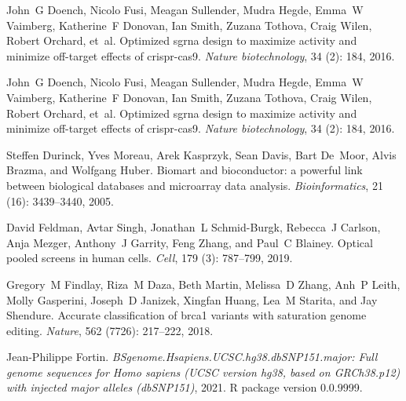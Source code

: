 \documentclass[pdftex,english,10pt]{article}
\begin{document}
{\begin{thebibliography}{105}
John~G Doench, Nicolo Fusi, Meagan Sullender, Mudra Hegde, Emma~W Vaimberg,
  Katherine~F Donovan, Ian Smith, Zuzana Tothova, Craig Wilen, Robert Orchard,
  et~al.
\newblock Optimized sgrna design to maximize activity and minimize off-target
  effects of crispr-cas9.
\newblock \emph{Nature biotechnology}, 34 (2): 184,
  2016{}.

John~G Doench, Nicolo Fusi, Meagan Sullender, Mudra Hegde, Emma~W Vaimberg,
  Katherine~F Donovan, Ian Smith, Zuzana Tothova, Craig Wilen, Robert Orchard,
  et~al.
\newblock Optimized sgrna design to maximize activity and minimize off-target
  effects of crispr-cas9.
\newblock \emph{Nature biotechnology}, 34 (2): 184,
  2016{}.

Steffen Durinck, Yves Moreau, Arek Kasprzyk, Sean Davis, Bart De~Moor, Alvis
  Brazma, and Wolfgang Huber.
\newblock Biomart and bioconductor: a powerful link between biological
  databases and microarray data analysis.
\newblock \emph{Bioinformatics}, 21 (16): 3439--3440, 2005.

David Feldman, Avtar Singh, Jonathan~L Schmid-Burgk, Rebecca~J Carlson, Anja
  Mezger, Anthony~J Garrity, Feng Zhang, and Paul~C Blainey.
\newblock Optical pooled screens in human cells.
\newblock \emph{Cell}, 179 (3): 787--799, 2019.

Gregory~M Findlay, Riza~M Daza, Beth Martin, Melissa~D Zhang, Anh~P Leith,
  Molly Gasperini, Joseph~D Janizek, Xingfan Huang, Lea~M Starita, and Jay
  Shendure.
\newblock Accurate classification of brca1 variants with saturation genome
  editing.
\newblock \emph{Nature}, 562 (7726): 217--222, 2018.

Jean-Philippe Fortin.
\newblock \emph{BSgenome.Hsapiens.UCSC.hg38.dbSNP151.major: Full genome
  sequences for Homo sapiens (UCSC version hg38, based on GRCh38.p12) with
  injected major alleles (dbSNP151)}, 2021{}.
\newblock R package version 0.0.9999.


\end{thebibliography}}
\end{document}

